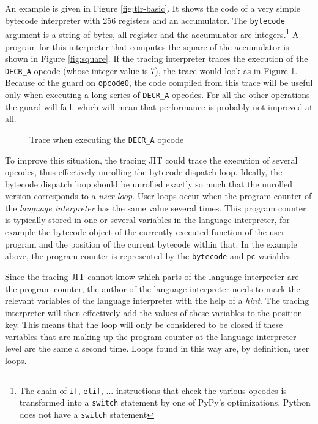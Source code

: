 \documentclass{sig-alternate}
\begin{document}
An example is given in Figure \ref{fig:tlr-basic}. It shows the code of a very
simple bytecode interpreter with 256 registers and an accumulator.  The
\texttt{bytecode} argument is a string of bytes, all register and the
accumulator are integers.\footnote{The
chain of \texttt{if}, \texttt{elif}, ... instructions that check the various
opcodes is transformed into a \texttt{switch} statement by one of PyPy's
optimizations. Python does not have a \texttt{switch} statement}
A program for this interpreter that computes
the square of the accumulator is shown in Figure \ref{fig:square}. If the
tracing interpreter traces the execution of the \texttt{DECR\_A} opcode (whose
integer value is 7), the trace would look as in Figure \ref{fig:trace-normal}.
Because of the guard on \texttt{opcode0}, the code compiled from this trace will
be useful only when executing a long series of \texttt{DECR\_A} opcodes. For all
the other operations the guard will fail, which will mean that performance is
probably not improved at all.

\begin{figure}

\caption{Trace when executing the \texttt{DECR\_A} opcode}
\label{fig:trace-normal}
\end{figure}

To improve this situation, the tracing JIT could trace the execution of several
opcodes, thus effectively unrolling the bytecode dispatch loop. Ideally, the
bytecode dispatch loop should be unrolled exactly so much that the unrolled version
corresponds to a \emph{user loop}. User loops
occur when the program counter of the \emph{language interpreter} has the
same value several times. This program counter is typically stored in one or several
variables in the language interpreter, for example the bytecode object of the
currently executed function of the user program and the position of the current
bytecode within that.  In the example above, the program counter is represented by 
the \texttt{bytecode} and \texttt{pc} variables.

Since the tracing JIT cannot know which parts of the language interpreter are
the program counter, the author of the language interpreter needs to mark the
relevant variables of the language interpreter with the help of a \emph{hint}.
The tracing interpreter will then effectively add the values of these variables
to the position key. This means that the loop will only be considered to be
closed if these variables that are making up the program counter at the language
interpreter level are the same a second time.  Loops found in this way are, by
definition, user loops.
\end{document}
